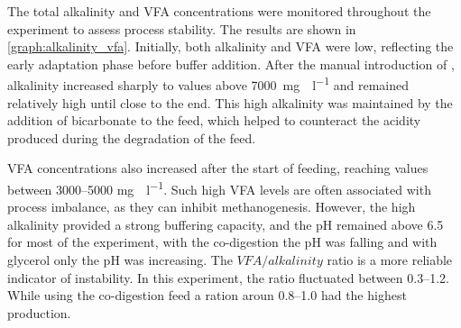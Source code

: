 The total alkalinity and VFA concentrations were monitored throughout the experiment to assess process stability. The results are shown in \cref{graph:alkalinity_vfa}. Initially, both alkalinity and VFA were low, reflecting the early adaptation phase before buffer addition. After the manual introduction of , alkalinity increased sharply to values above \qty{7000}{\milli\gram\CaCO\per\litre} and remained relatively high until close to the end. This high alkalinity was maintained by the addition of bicarbonate to the feed, which helped to counteract the acidity produced during the degradation of the feed.

VFA concentrations also increased after the start of feeding, reaching values between \numrange{3000}{5000} \unit{\milli\gram\CHCOOH\per\litre}. Such high VFA levels are often associated with process imbalance, as they can inhibit methanogenesis. However, the high alkalinity provided a strong buffering capacity, and the pH remained above \num{6.5} for most of the experiment, with the co-digestion the pH was falling and with glycerol only the pH was increasing. The $VFA/alkalinity$ ratio is a more reliable indicator of instability. In this experiment, the ratio fluctuated between \numrange{0.3}{1.2}. While using the co-digestion feed a ration aroun \numrange{0.8}{1.0} had the highest production.

